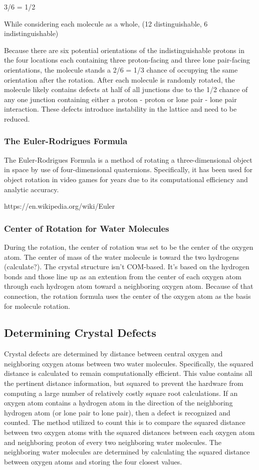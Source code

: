 3/6 = 1/2

While considering each molecule as a whole, (12 distinguishable, 6 indistinguishable)

Because there are six potential orientations of the indistinguishable protons in the four locations each containing three proton-facing and three lone pair-facing orientations, the molecule stands a 2/6 = 1/3 chance of occupying the same orientation after the rotation.
After each molecule is randomly rotated, the molecule likely contains defects at half of all junctions due to the 1/2 chance of any one junction containing either a proton - proton or lone pair - lone pair interaction. 
These defects introduce instability in the lattice and need to be reduced.

\subsubsection{The Euler-Rodrigues Formula}
The Euler-Rodrigues Formula is a method of rotating a three-dimensional object in space by use of four-dimensional quaternions. 
Specifically, it has been used for object rotation in video games for years due to its computational efficiency and analytic accuracy.

https://en.wikipedia.org/wiki/Euler%

\subsubsection{Center of Rotation for Water Molecules}
During the rotation, the center of rotation was set to be the center of the oxygen atom. 
The center of mass of the water molecule is toward the two hydrogens (calculate?). 
The crystal structure isn’t COM-based. 
It’s based on the hydrogen bonds and those line up as an extention from the center of each oxygen atom through each hydrogen atom toward a neighboring oxygen atom. 
Because of that connection, the rotation formula uses the center of the oxygen atom as the basis for molecule rotation.

\subsection{Determining Crystal Defects}
Crystal defects are determined by distance between central oxygen and neighboring oxygen atoms between two water molecules. 
Specifically, the squared distance is calculated to remain computationally efficient. 
This value contains all the pertinent distance information, but squared to prevent the hardware from computing a large number of relatively costly square root calculations. 
If an oxygen atom contains a hydrogen atom in the direction of the neighboring hydrogen atom (or lone pair to lone pair), then a defect is recognized and counted. 
The method utilized to count this is to compare the squared distance between two oxygen atoms with the squared distances between each oxygen atom and neighboring proton of every two neighboring water molecules. 
The neighboring water molecules are determined by calculating the squared distance between oxygen atoms and storing the four closest values.

